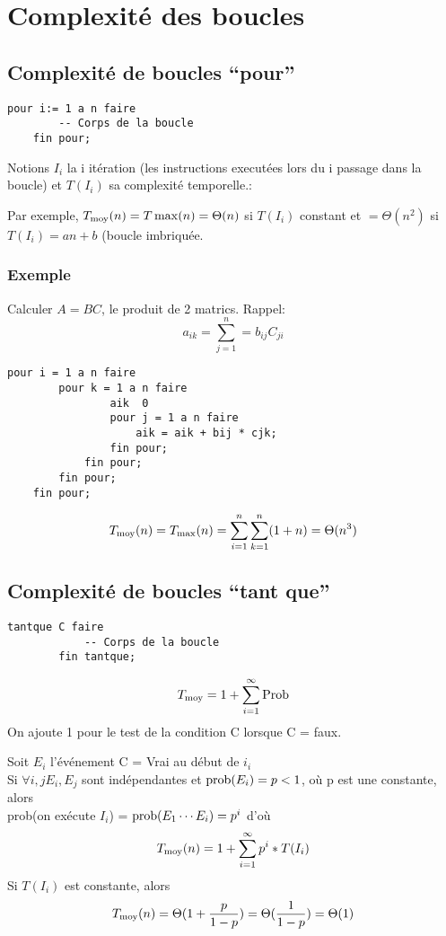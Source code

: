 \chapter{Complexité des boucles}
\minitoc
	\section{Complexité de boucles ``pour''}
\begin{lstlisting}[language=algo]
	pour i:= 1 a n faire
		-- Corps de la boucle
	fin pour;
\end{lstlisting}
Notions $I_i$ la i\ieme{} itération (les instructions executées lors du i\ieme{} passage dans la boucle) et $T(I_i)$ sa complexité temporelle.:

Par exemple, $T_\moy(n) = T\max(n) = \Theta(n)$ si $T(I_i)$ constant et $= \Theta(n^2)$ si $T(I_i) = an+b$ (boucle imbriquée.

\subsection{Exemple}
Calculer $A=BC$, le produit de 2 matrics. Rappel:
$$a_{ik} = \sum^n_{j=1} = b_{ij}C_{ji}$$
\begin{lstlisting}[language=algo]
	pour i = 1 a n faire
		pour k = 1 a n faire
				aik  0
				pour j = 1 a n faire
					aik = aik + bij * cjk;
				fin pour;
			fin pour;
		fin pour;
	fin pour;
\end{lstlisting}

$$T_{\moy}(n) = T_{\max}(n) = \sum^n_{i=1}\sum^n_{k=1}(1+n) = \Theta(n^3)$$

	\section{Complexité de boucles ``tant que''}\label{complexiteboucletantque}

	\begin{lstlisting}[language=algo]
		tantque C faire
			-- Corps de la boucle
		fin tantque;
	\end{lstlisting}
	$$T_{\moy} = 1 + \sum^\infty_{i=1}\textrm{Prob}$$
	On ajoute 1 pour le test de la condition C lorsque C = faux.

	Soit $E_i$ l'événement C = Vrai au début de $i_i$\\
	Si $\forall i, j E_i, E_j$ sont indépendantes et $\prob(E_i) = p < 1$, où p est une constante, alors\\ prob(on exécute $I_i$) = $\prob(E_1\cdots E_i) = p^i$ d'où
	$$T_{\moy}(n) = 1 + \sum^{\infty}_{i=1}p^i*T(I_i)$$
	Si $T(I_i)$ est constante, alors $$T_{\moy}(n) = \Theta (1 + \frac{p}{1-p}) = \Theta (\frac{1}{1-p}) = \Theta(1)$$

